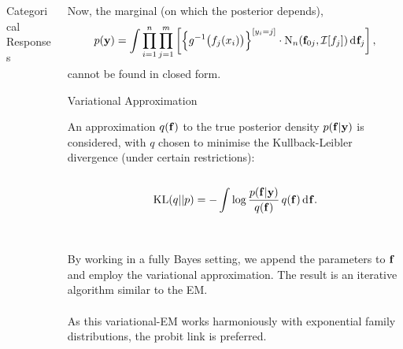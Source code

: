 \documentclass{beamer}
\newlength{\onecolwid}
\newlength{\twocolwid}
\begin{document}
\begin{frame}[t]
\begin{columns}[t]
\begin{column}{\twocolwid}
\begin{columns}[t,totalwidth=\twocolwid]
\begin{column}{\onecolwid}
\begin{block}{Categorical Responses}
\end{block}

\end{column} %



\begin{column}{\onecolwid}  %



\vspace{-2cm}
\begin{block}{}

Now, the marginal (on which the posterior depends),
\[
  p({\mathbf y}) = \int \prod_{i=1}^n \prod_{j=1}^m \left[ \Big\{ g^{-1}\big( f_j(x_i) \big) \Big\}^{[y_i = j]} \cdot \operatorname{N}_n({\mathbf f}_{0j},{\mathcal I}[f_j]) \operatorname{d\!\:\!} {\mathbf f}_j \right],
\]
cannot be found in closed form.

\end{block}

\begin{block}{Variational Approximation}

An approximation $q({\mathbf f})$ to the true posterior density $p({\mathbf f}|{\mathbf y})$ is considered, with $q$ chosen to minimise the Kullback-Leibler divergence (under certain restrictions):
\\~\\[-2.5ex]
\[
  \operatorname{KL}(q||p) = -\int \log \frac{p({\mathbf f}|{\mathbf y})}{q({\mathbf f})} \, q({\mathbf f}) \operatorname{d\!\:\!} {\mathbf f}.
\]
\\~\\[-0.3ex]
By working in a fully Bayes setting, we append the parameters to ${\mathbf f}$ and employ the variational approximation. The result is an iterative algorithm similar to the EM.
\\~\\[-0.8ex]
As this variational-EM works harmoniously with exponential family distributions, the probit link is preferred.
  
\end{block}


\end{column}
\end{columns}
\end{column}
\end{columns}
\end{frame}
\end{document}
